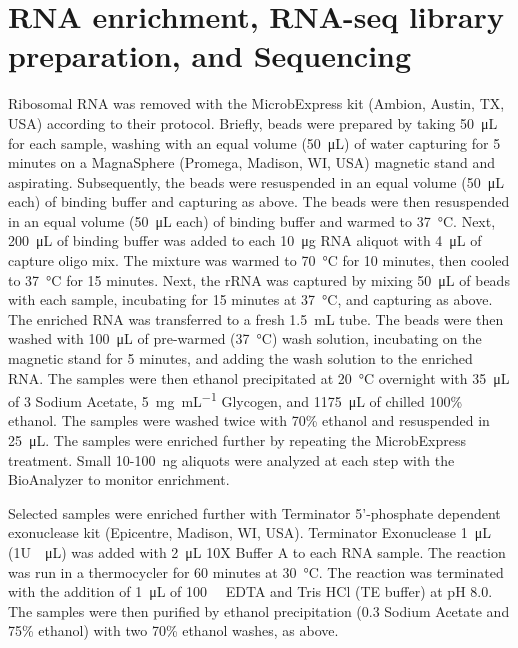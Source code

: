 \section{RNA enrichment, RNA-seq library preparation, and Sequencing}
Ribosomal RNA was removed with the MicrobExpress kit (Ambion, Austin, TX, USA) according to their protocol. Briefly, beads were prepared by taking \SI{50}{\micro\liter} for each sample, washing with an equal volume (\SI{50}{\micro\liter}) of water capturing for 5 minutes on a MagnaSphere (Promega, Madison, WI, USA) magnetic stand and aspirating. Subsequently, the beads were resuspended in an equal volume (\SI{50}{\micro\liter} each) of binding buffer and capturing as above. The beads were then resuspended in an equal volume (\SI{50}{\micro\liter} each) of binding buffer and warmed to \SI{37}{\degreeCelsius}. Next, \SI{200}{\micro\liter} of binding buffer was added to each \SI{10}{\micro\gram} RNA aliquot with \SI{4}{\micro\liter} of capture oligo mix. The mixture was warmed to \SI{70}{\degreeCelsius} for 10 minutes, then cooled to \SI{37}{\degreeCelsius} for 15 minutes. Next, the rRNA was captured by mixing \SI{50}{\micro\liter} of beads with each sample, incubating for 15 minutes at \SI{37}{\degreeCelsius}, and capturing as above. The enriched RNA was transferred to a fresh \SI{1.5}{\milli\liter} tube. The beads were then washed with \SI{100}{\micro\liter} of pre-warmed (\SI{37}{\degreeCelsius}) wash solution, incubating on the magnetic stand for 5 minutes, and adding the wash solution to the enriched RNA. The samples were then ethanol precipitated at \SI{20}{\degreeCelsius} overnight with \SI{35}{\micro\liter} of \SI{3}{\Molar} Sodium Acetate, \SI{5}{\milli\gram\per\milli\liter} Glycogen, and \SI{1175}{\micro\liter} of chilled 100\% ethanol. The samples were washed twice with 70\% ethanol and resuspended in \SI{25}{\micro\liter}. The samples were enriched further by repeating the MicrobExpress treatment. Small 10-\SI{100}{\nano\gram} aliquots were analyzed at each step with the BioAnalyzer to monitor enrichment.

Selected samples were enriched further with Terminator 5'-phosphate dependent exonuclease kit (Epicentre, Madison, WI, USA). Terminator Exonuclease \SI{1}{\micro\liter} (1U\SI{}{\per\micro\liter}) was added with \SI{2}{\micro\liter} 10X Buffer A to each RNA sample. The reaction was run in a thermocycler for 60 minutes at \SI{30}{\degreeCelsius}. The reaction was terminated with the addition of \SI{1}{\micro\liter} of \SI{100}{\milli\Molar} EDTA and Tris HCl (TE buffer) at pH 8.0. The samples were then purified by ethanol precipitation (\SI{0.3}{\Molar} Sodium Acetate and 75\% ethanol) with two 70\% ethanol washes, as above.

